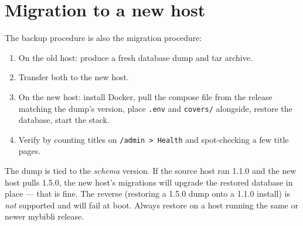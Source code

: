 \section{Migration to a new host}

The backup procedure is also the migration procedure:

\begin{enumerate}
  \item On the old host: produce a fresh database dump and tar
        archive.
  \item Transfer both to the new host.
  \item On the new host: install Docker, pull the compose file from
        the release matching the dump's version, place \texttt{.env}
        and \texttt{covers/} alongside, restore the database, start
        the stack.
  \item Verify by counting titles on \texttt{/admin > Health} and
        spot-checking a few title pages.
\end{enumerate}

\begin{warning}
The dump is tied to the \emph{schema} version. If the source host
ran 1.1.0 and the new host pulls 1.5.0, the new host's migrations
will upgrade the restored database in place — that is fine. The
reverse (restoring a 1.5.0 dump onto a 1.1.0 install) is \emph{not}
supported and will fail at boot. Always restore on a host running
the same or newer mybibli release.
\end{warning}
